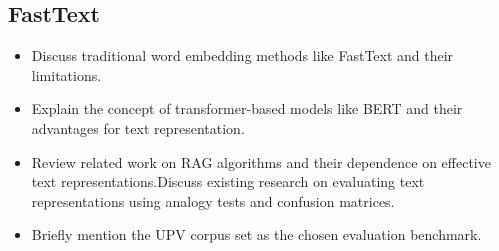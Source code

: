 \subsection{FastText \cite{fasttext}}





\begin{itemize}
    \item Discuss traditional word embedding methods like FastText and their limitations.
    \item Explain the concept of transformer-based models like BERT and their advantages for text representation.
    \item Review related work on RAG algorithms and their dependence on effective text representations.Discuss existing research on evaluating text representations using analogy tests and confusion matrices.
    \item Briefly mention the UPV corpus set as the chosen evaluation benchmark.
\end{itemize}